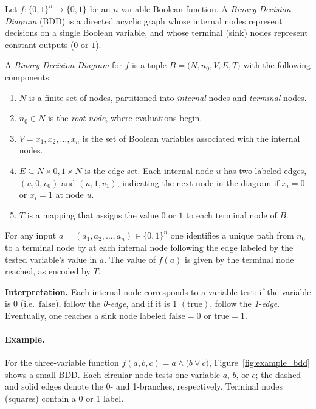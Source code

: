 Let $f: \{0,1\}^n \to \{0,1\}$ be an $n$-variable Boolean function. A \emph{Binary Decision Diagram} (BDD) is a directed acyclic graph whose internal nodes represent decisions on a single Boolean variable, and whose terminal (sink) nodes represent constant outputs ($0$ or $1$).

\begin{definition}
\label{def:bdd}
A \emph{Binary Decision Diagram} for $f$ is a tuple $B =\bigl(N,n_0,V,E,T\bigr)$ with the following components:
\begin{enumerate}
\item $N$ is a finite set of nodes, partitioned into \emph{internal} nodes and \emph{terminal} nodes.
\item $n_0 \in N$ is the \emph{root node}, where evaluations begin.
\item $V={x_1,x_2,\dots,x_n}$ is the set of Boolean variables associated with the internal nodes.
\item $E \subseteq N \times {0,1} \times N$ is the edge set. Each internal node $u$ has two labeled edges, $(u,0,v_0)$ and $(u,1,v_1)$, indicating the next node in the diagram if $x_i=0$ or $x_i=1$ at node $u$.
\item $T$ is a mapping that assigns the value $0$ or $1$ to each terminal node of $B$.
\end{enumerate}
For any input $a = (a_1,a_2,\dots,a_n)\in\{0,1\}^n$ one identifies a unique path from $n_0$ to a terminal node by at each internal node following the edge labeled by the tested variable’s value in $a$. The value of $f(a)$ is given by the terminal node reached, as encoded by $T$.
\end{definition}

\noindent\textbf{Interpretation.} Each internal node corresponds to a variable test: if the variable is $0$ (i.e.\ $\text{false}$), follow the \emph{0-edge}, and if it is 1 $(\text{true})$, follow the \emph{1-edge}. Eventually, one reaches a sink node labeled $\text{false}=0$ or $\text{true}=1$.

\paragraph{Example.} For the three-variable function
$f(a,b,c)=a \land \bigl(b \lor c\bigr)$,
Figure~\ref{fig:example_bdd} shows a small BDD. Each circular node tests one variable $a$, $b$, or $c$; the dashed and solid edges denote the 0- and 1-branches, respectively. Terminal nodes (squares) contain a 0 or 1 label.

